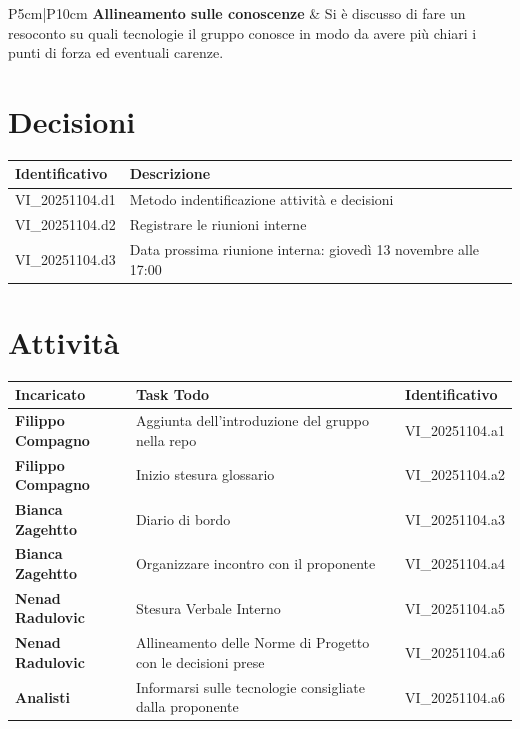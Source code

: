 \documentclass[a4paper,12pt]{article}
\begin{document}
\begin{longtable}{P{5cm}|P{10cm}}
    \textbf{Allineamento sulle conoscenze} & Si è discusso di fare un resoconto su quali tecnologie il gruppo conosce in modo da avere più chiari i punti di forza ed eventuali carenze. \\ 
\end{longtable}

\section{Decisioni}
\begin{tabularx}{\textwidth}{|l|X|l|}
    \hline
    \textbf{Identificativo} & \textbf{Descrizione}\\
    \hline
    VI\_20251104.d1 & Metodo indentificazione attività e decisioni\\
    \hline
    VI\_20251104.d2 & Registrare le riunioni interne\\
    \hline
    VI\_20251104.d3 & Data prossima riunione interna: giovedì 13 novembre alle 17:00 \\
    \hline
\end{tabularx}


\section{Attività}
\begin{tabularx}{\textwidth}{|l|X|l|}
    \hline
    \textbf{Incaricato} & \textbf{Task Todo} & \textbf{Identificativo} \\
    \hline
    \textbf{Filippo Compagno} & Aggiunta dell'introduzione del gruppo nella repo & VI\_20251104.a1\\
    \hline
    \textbf{Filippo Compagno} & Inizio stesura glossario & VI\_20251104.a2\\
    \hline
    \textbf{Bianca Zagehtto} & Diario di bordo & VI\_20251104.a3\\
    \hline
    \textbf{Bianca Zagehtto} & Organizzare incontro con il proponente & VI\_20251104.a4\\
    \hline
    \textbf{Nenad Radulovic} & Stesura Verbale Interno & VI\_20251104.a5\\
    \hline
    \textbf{Nenad Radulovic} & Allineamento delle Norme di Progetto con le decisioni prese & VI\_20251104.a6\\
    \hline
    \textbf{Analisti} & Informarsi sulle tecnologie consigliate dalla proponente & VI\_20251104.a6\\
    \hline

\end{tabularx}
\end{document}

